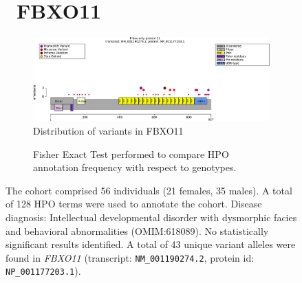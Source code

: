 \begin{figure}[htbp]
\section*{ FBXO11}
\centering
\begin{subfigure}[b]{0.95\textwidth}
\centering
\includegraphics[width=\textwidth]{ img/FBXO11_protein_diagram.pdf} 
\captionsetup{justification=raggedright,singlelinecheck=false}
\caption{Distribution of variants in FBXO11}
\end{subfigure}

\vspace{2em}

\begin{subfigure}[b]{0.95\textwidth}
\centering
{}
\captionsetup{justification=raggedright,singlelinecheck=false}
\caption{Fisher Exact Test performed to compare HPO annotation frequency with respect to genotypes.}
\end{subfigure}

\vspace{2em}

\caption{The cohort comprised 56 individuals (21 females, 35 males). A total of 128 HPO terms were used to annotate the cohort. Disease diagnosis: Intellectual developmental disorder with dysmorphic facies and behavioral abnormalities (OMIM:618089). No statistically significant results identified. A total of 43 unique variant alleles were found in \textit{FBXO11} (transcript: \texttt{NM\_001190274.2}, protein id: \texttt{NP\_001177203.1}).}
\end{figure}
